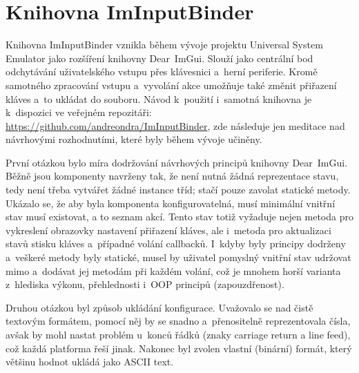 \chapter{Knihovna ImInputBinder}
\label{apx:binder}

Knihovna ImInputBinder vznikla během vývoje projektu Universal System Emulator jako rozšíření knihovny Dear~ImGui. Slouží jako centrální bod odchytávání uživatelského vstupu přes klávesnici a~herní periferie. Kromě samotného zpracování vstupu a~vyvolání akce umožňuje také změnit přiřazení kláves a~to ukládat do souboru. Návod k~použití i~samotná knihovna je k~dispozici ve veřejném repozitáři: \url{https://github.com/andreondra/ImInputBinder}, zde následuje jen meditace nad návrhovými rozhodnutími, které byly během vývoje učiněny.

První otázkou bylo míra dodržování návrhových principů knihovny Dear~ImGui. Běžně jsou komponenty navrženy tak, že není nutná žádná reprezentace stavu, tedy není třeba vytvářet žádné instance tříd; stačí pouze zavolat statické metody. Ukázalo se, že aby byla komponenta konfigurovatelná, musí minimální vnitřní stav musí existovat, a to seznam akcí. Tento stav totiž vyžaduje nejen metoda pro vykreslení obrazovky nastavení přiřazení kláves, ale i~metoda pro aktualizaci stavů stisku kláves a~případné volání callbacků. I~kdyby byly principy dodrženy a~veškeré metody byly statické, musel by uživatel pomyslný vnitřní stav udržovat mimo a~dodávat jej metodám při každém volání, což je mnohem horší varianta z~hlediska výkonu, přehlednosti i~OOP principů (zapouzdřenost).

Druhou otázkou byl způsob ukládání konfigurace. Uvažovalo se nad čistě textovým formátem, pomocí něj by se snadno a~přenositelně reprezentovala čísla, avšak by mohl nastat problém u~konců řádků (znaky carriage return a line feed), což každá platforma řeší jinak. Nakonec byl zvolen vlastní (binární) formát, který většinu hodnot ukládá jako ASCII text.